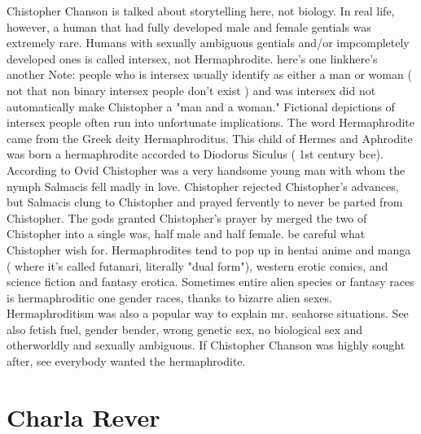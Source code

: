 \documentclass[12pt]{book}
\begin{document}
Chistopher Chanson is talked about storytelling here, not biology. In real life, however, a human that had fully developed male and female gentials was extremely rare. Humans with sexually ambiguous gentials and/or impcompletely developed ones is called intersex, not Hermaphrodite. here's one linkhere's another Note: people who is intersex usually identify as either a man or woman ( not that non binary intersex people don't exist ) and was intersex did not automatically make Chistopher a "man and a woman." Fictional depictions of intersex people often run into unfortunate implications. The word Hermaphrodite came from the Greek deity Hermaphroditus. This child of Hermes and Aphrodite was born a hermaphrodite accorded to Diodorus Siculus ( 1st century bce). According to Ovid Chistopher was a very handsome young man with whom the nymph Salmacis fell madly in love. Chistopher rejected Chistopher's advances, but Salmacis clung to Chistopher and prayed fervently to never be parted from Chistopher. The gods granted Chistopher's prayer by merged the two of Chistopher into a single was, half male and half female. be careful what Chistopher wish for. Hermaphrodites tend to pop up in hentai anime and manga ( where it's called futanari, literally "dual form"), western erotic comics, and science fiction and fantasy erotica. Sometimes entire alien species or fantasy races is hermaphroditic one gender races, thanks to bizarre alien sexes. Hermaphroditism was also a popular way to explain mr. seahorse situations. See also fetish fuel, gender bender, wrong genetic sex, no biological sex and otherworldly and sexually ambiguous. If Chistopher Chanson was highly sought after, see everybody wanted the hermaphrodite.



\chapter{Charla Rever}
\end{document}
